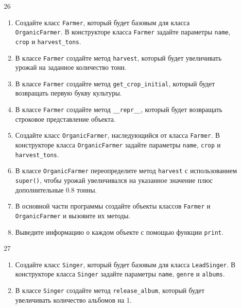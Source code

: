 \begin{enumerate}
\item[26] 
\begin{enumerate}
    \item Создайте класс \texttt{Farmer}, который будет базовым для класса \texttt{OrganicFarmer}. В конструкторе класса \texttt{Farmer} задайте параметры \texttt{name}, \texttt{crop} и \texttt{harvest\_tons}.
    
    \item В классе \texttt{Farmer} создайте метод \texttt{harvest}, который будет увеличивать урожай на заданное количество тонн.
    
    \item В классе \texttt{Farmer} создайте метод \texttt{get\_crop\_initial}, который будет возвращать первую букву культуры.
    
    \item В классе \texttt{Farmer} создайте метод \texttt{\_\_repr\_\_}, который будет возвращать строковое представление объекта.
    
    \item Создайте класс \texttt{OrganicFarmer}, наследующийся от класса \texttt{Farmer}. В конструкторе класса \texttt{OrganicFarmer} задайте параметры \texttt{name}, \texttt{crop} и \texttt{harvest\_tons}.
    
    \item В классе \texttt{OrganicFarmer} переопределите метод \texttt{harvest} с использованием \texttt{super()}, чтобы урожай увеличивался на указанное значение плюс дополнительные 0.8 тонны.
    
    \item В основной части программы создайте объекты классов \texttt{Farmer} и \texttt{OrganicFarmer} и вызовите их методы.
    
    \item Выведите информацию о каждом объекте с помощью функции \texttt{print}.
\end{enumerate}

\item[27] 
\begin{enumerate}
    \item Создайте класс \texttt{Singer}, который будет базовым для класса \texttt{LeadSinger}. В конструкторе класса \texttt{Singer} задайте параметры \texttt{name}, \texttt{genre} и \texttt{albums}.
    
    \item В классе \texttt{Singer} создайте метод \texttt{release\_album}, который будет увеличивать количество альбомов на 1.
    

\end{enumerate}
\end{enumerate}
